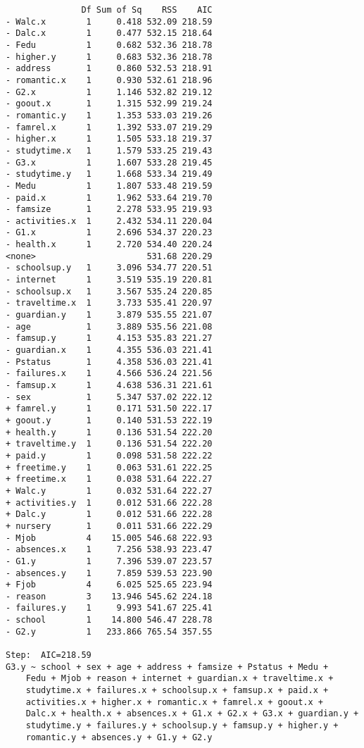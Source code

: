 \documentclass[11pt]{article}
\begin{document}
\begin{enumerate}
\begin{verbatim}
               Df Sum of Sq    RSS    AIC
- Walc.x        1     0.418 532.09 218.59
- Dalc.x        1     0.477 532.15 218.64
- Fedu          1     0.682 532.36 218.78
- higher.y      1     0.683 532.36 218.78
- address       1     0.860 532.53 218.91
- romantic.x    1     0.930 532.61 218.96
- G2.x          1     1.146 532.82 219.12
- goout.x       1     1.315 532.99 219.24
- romantic.y    1     1.353 533.03 219.26
- famrel.x      1     1.392 533.07 219.29
- higher.x      1     1.505 533.18 219.37
- studytime.x   1     1.579 533.25 219.43
- G3.x          1     1.607 533.28 219.45
- studytime.y   1     1.668 533.34 219.49
- Medu          1     1.807 533.48 219.59
- paid.x        1     1.962 533.64 219.70
- famsize       1     2.278 533.95 219.93
- activities.x  1     2.432 534.11 220.04
- G1.x          1     2.696 534.37 220.23
- health.x      1     2.720 534.40 220.24
<none>                      531.68 220.29
- schoolsup.y   1     3.096 534.77 220.51
- internet      1     3.519 535.19 220.81
- schoolsup.x   1     3.567 535.24 220.85
- traveltime.x  1     3.733 535.41 220.97
- guardian.y    1     3.879 535.55 221.07
- age           1     3.889 535.56 221.08
- famsup.y      1     4.153 535.83 221.27
- guardian.x    1     4.355 536.03 221.41
- Pstatus       1     4.358 536.03 221.41
- failures.x    1     4.566 536.24 221.56
- famsup.x      1     4.638 536.31 221.61
- sex           1     5.347 537.02 222.12
+ famrel.y      1     0.171 531.50 222.17
+ goout.y       1     0.140 531.53 222.19
+ health.y      1     0.136 531.54 222.20
+ traveltime.y  1     0.136 531.54 222.20
+ paid.y        1     0.098 531.58 222.22
+ freetime.y    1     0.063 531.61 222.25
+ freetime.x    1     0.038 531.64 222.27
+ Walc.y        1     0.032 531.64 222.27
+ activities.y  1     0.012 531.66 222.28
+ Dalc.y        1     0.012 531.66 222.28
+ nursery       1     0.011 531.66 222.29
- Mjob          4    15.005 546.68 222.93
- absences.x    1     7.256 538.93 223.47
- G1.y          1     7.396 539.07 223.57
- absences.y    1     7.859 539.53 223.90
+ Fjob          4     6.025 525.65 223.94
- reason        3    13.946 545.62 224.18
- failures.y    1     9.993 541.67 225.41
- school        1    14.800 546.47 228.78
- G2.y          1   233.866 765.54 357.55

Step:  AIC=218.59
G3.y ~ school + sex + age + address + famsize + Pstatus + Medu + 
    Fedu + Mjob + reason + internet + guardian.x + traveltime.x + 
    studytime.x + failures.x + schoolsup.x + famsup.x + paid.x + 
    activities.x + higher.x + romantic.x + famrel.x + goout.x + 
    Dalc.x + health.x + absences.x + G1.x + G2.x + G3.x + guardian.y + 
    studytime.y + failures.y + schoolsup.y + famsup.y + higher.y + 
    romantic.y + absences.y + G1.y + G2.y


\end{verbatim}
\end{enumerate}
\end{document}
